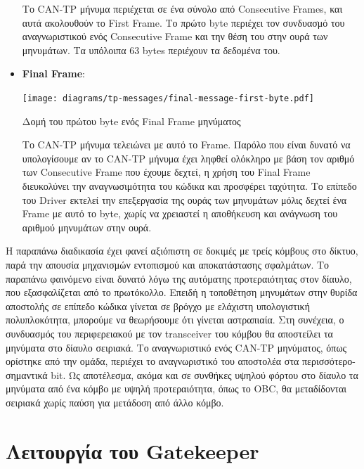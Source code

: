 \documentclass[a4paper,nobib,justified]{tufte-book}
\begin{document}
\begin{itemize}
\begin{marginfigure}
	\end{marginfigure} Το CAN-TP μήνυμα περιέχεται σε ένα σύνολο από Consecutive Frames, και αυτά ακολουθούν το First Frame. Το πρώτο byte περιέχει τον συνδυασμό του αναγνωριστικού ενός Consecutive Frame και την θέση του στην ουρά των μηνυμάτων. Τα υπόλοιπα 63 bytes περιέχουν τα δεδομένα του.
	\item \textbf{Final Frame}: \begin{marginfigure}
		\centering
		\texttt{[image: diagrams/tp-messages/final-message-first-byte.pdf]}
		\label{fig:tp-final-frame-first-byte}
		\caption{Δομή του πρώτου byte ενός Final Frame μηνύματος}
	\end{marginfigure} Το CAN-TP μήνυμα τελειώνει με αυτό το Frame. Παρόλο που είναι δυνατό να υπολογίσουμε αν το CAN-TP μήνυμα έχει ληφθεί ολόκληρο με βάση τον αριθμό των Consecutive Frame που έχουμε δεχτεί, η χρήση του Final Frame διευκολύνει την αναγνωσιμότητα του κώδικα και προσφέρει ταχύτητα. Το επίπεδο του Driver εκτελεί την επεξεργασία της ουράς των μηνυμάτων μόλις δεχτεί ένα Frame με αυτό το byte, χωρίς να χρειαστεί η αποθήκευση και ανάγνωση του αριθμού μηνυμάτων στην ουρά. 
\end{itemize}

\FloatBarrier
Η παραπάνω διαδικασία έχει φανεί αξιόπιστη σε δοκιμές με τρείς κόμβους στο δίκτυο, παρά την απουσία μηχανισμών εντοπισμού και αποκατάστασης σφαλμάτων. Το παραπάνω φαινόμενο είναι δυνατό λόγω της αυτόματης προτεραιότητας στον δίαυλο, που εξασφαλίζεται από το πρωτόκολλο. Επειδή η τοποθέτηση μηνυμάτων στην θυρίδα αποστολής σε επίπεδο κώδικα γίνεται σε βρόγχο με ελάχιστη υπολογιστική πολυπλοκότητα, μπορούμε να θεωρήσουμε ότι γίνεται αστραπιαία. Στη συνέχεια, ο συνδυασμός του περιφερειακού με τον transceiver του κόμβου θα αποστείλει τα μηνύματα στο δίαυλο σειριακά. Το αναγνωριστικό ενός CAN-TP μηνύματος, όπως ορίστηκε από την ομάδα, περιέχει το αναγνωριστικό του αποστολέα στα περισσότερο-σημαντικά bit. Ως αποτέλεσμα, ακόμα και σε συνθήκες υψηλού φόρτου στο δίαυλο τα μηνύματα από ένα κόμβο με υψηλή προτεραιότητα, όπως το OBC, θα μεταδίδονται σειριακά χωρίς παύση για μετάδοση από άλλο κόμβο. 

\clearpage
\section{Λειτουργία του Gatekeeper}
\label{sec:gatekeeper}
\end{document}

